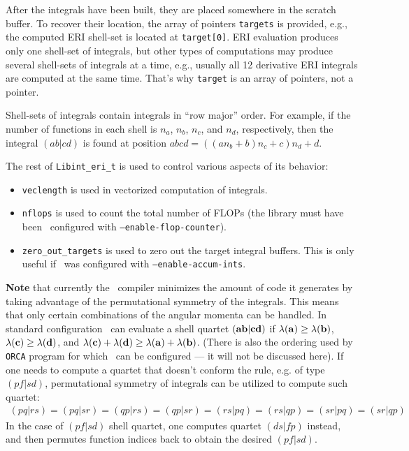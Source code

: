 \documentclass[10pt]{article}
\begin{document}
After the integrals have been built, they are placed somewhere in the scratch buffer.
To recover their location, the array of pointers {\tt targets} is provided, e.g.,
the computed ERI shell-set is located at {\tt target[0]}.
ERI evaluation produces only one shell-set of integrals, but other types of computations
may produce several shell-sets of integrals at a time, e.g., usually all 12 derivative
ERI integrals are computed at the same time. That's why {\tt target} is an array of pointers, not a pointer.

Shell-sets of integrals contain integrals in ``row major'' order.\cite{KnuthACP} For example, if
the number of functions in each shell is $n_a$, $n_b$, $n_c$, and $n_d$, respectively,
then the integral $(ab|cd)$ is found at position $abcd = ( (a n_b + b) n_c + c) n_d + d$.

The rest of {\tt Libint\_eri\_t} is used to control various aspects of its behavior:
\begin{itemize}
\item {\tt veclength} is used in vectorized computation of integrals.
\item {\tt nflops} is used to count the total number of FLOPs (the library must have been \
configured with {\tt --enable-flop-counter}).
\item {\tt zero\_out\_targets} is used to zero out the target integral buffers. This is only useful
  if \LIBINT\ was configured with {\tt --enable-accum-ints}.
\end{itemize}

{\bf Note} that currently the \LIBINT\ compiler minimizes the amount of code it
generates by taking advantage of the permutational symmetry of the integrals.
This means that only certain combinations of the angular momenta can be handled.
In standard configuration \LIBINT\ can evaluate a shell quartet $({\bf ab}|{\bf cd})$ if $\lambda({\bf a}) \geq \lambda({\bf b})$, $\lambda({\bf c}) \geq \lambda({\bf d})$, and $\lambda({\bf c}) + \lambda({\bf d}) \geq \lambda({\bf a}) + \lambda({\bf b})$.
(There is also the ordering used by {\tt ORCA} program for which \LIBINT\ can be
configured --- it will not be discussed here). If one needs to compute a quartet that doesn't conform the rule,
e.g. of type $(pf|sd)$, permutational symmetry of integrals can be utilized to compute such quartet:
\begin{eqnarray}
(pq|rs) = (pq|sr) = (qp|rs) = (qp|sr) = (rs|pq) = (rs|qp)= (sr|pq) = (sr|qp)
\end{eqnarray}
In the case of $(pf|sd)$ shell quartet, one computes quartet $(ds|fp)$ instead, and then
permutes function indices back to obtain the desired $(pf|sd)$.
\end{document}
